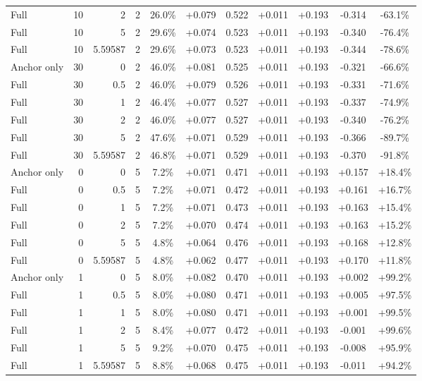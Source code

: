 \begin{table}[htbp]
\begin{tabular}{lrrrccccccc}
Full & 10 & 2 & 2 & 26.0\% & +0.079 & 0.522 & +0.011 & +0.193 & -0.314 & -63.1\% \\
Full & 10 & 5 & 2 & 29.6\% & +0.074 & 0.523 & +0.011 & +0.193 & -0.340 & -76.4\% \\
Full & 10 & 5.59587 & 2 & 29.6\% & +0.073 & 0.523 & +0.011 & +0.193 & -0.344 & -78.6\% \\
Anchor only & 30 & 0 & 2 & 46.0\% & +0.081 & 0.525 & +0.011 & +0.193 & -0.321 & -66.6\% \\
Full & 30 & 0.5 & 2 & 46.0\% & +0.079 & 0.526 & +0.011 & +0.193 & -0.331 & -71.6\% \\
Full & 30 & 1 & 2 & 46.4\% & +0.077 & 0.527 & +0.011 & +0.193 & -0.337 & -74.9\% \\
Full & 30 & 2 & 2 & 46.0\% & +0.077 & 0.527 & +0.011 & +0.193 & -0.340 & -76.2\% \\
Full & 30 & 5 & 2 & 47.6\% & +0.071 & 0.529 & +0.011 & +0.193 & -0.366 & -89.7\% \\
Full & 30 & 5.59587 & 2 & 46.8\% & +0.071 & 0.529 & +0.011 & +0.193 & -0.370 & -91.8\% \\
Anchor only & 0 & 0 & 5 & 7.2\% & +0.071 & 0.471 & +0.011 & +0.193 & +0.157 & +18.4\% \\
Full & 0 & 0.5 & 5 & 7.2\% & +0.071 & 0.472 & +0.011 & +0.193 & +0.161 & +16.7\% \\
Full & 0 & 1 & 5 & 7.2\% & +0.071 & 0.473 & +0.011 & +0.193 & +0.163 & +15.4\% \\
Full & 0 & 2 & 5 & 7.2\% & +0.070 & 0.474 & +0.011 & +0.193 & +0.163 & +15.2\% \\
Full & 0 & 5 & 5 & 4.8\% & +0.064 & 0.476 & +0.011 & +0.193 & +0.168 & +12.8\% \\
Full & 0 & 5.59587 & 5 & 4.8\% & +0.062 & 0.477 & +0.011 & +0.193 & +0.170 & +11.8\% \\
Anchor only & 1 & 0 & 5 & 8.0\% & +0.082 & 0.470 & +0.011 & +0.193 & +0.002 & +99.2\% \\
Full & 1 & 0.5 & 5 & 8.0\% & +0.080 & 0.471 & +0.011 & +0.193 & +0.005 & +97.5\% \\
Full & 1 & 1 & 5 & 8.0\% & +0.080 & 0.471 & +0.011 & +0.193 & +0.001 & +99.5\% \\
Full & 1 & 2 & 5 & 8.4\% & +0.077 & 0.472 & +0.011 & +0.193 & -0.001 & +99.6\% \\
Full & 1 & 5 & 5 & 9.2\% & +0.070 & 0.475 & +0.011 & +0.193 & -0.008 & +95.9\% \\
Full & 1 & 5.59587 & 5 & 8.8\% & +0.068 & 0.475 & +0.011 & +0.193 & -0.011 & +94.2\% \\

\end{tabular}
\end{table}
